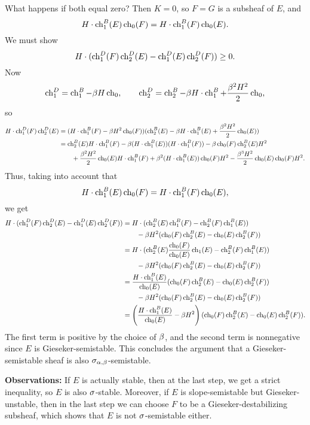 \documentclass[letterpaper,10pt]{article}
\begin{document}
What happens if both equal zero? Then $K = 0$, so $F = G$ is a subsheaf of $E$, and 
\[  H \cdot \ch_1^B(E) \ch_0(F) = H\cdot \ch_1^B(F) \ch_0(E). \]
We must show
\[ H \cdot (\ch_1^D(F) \ch_2^D(E) - \ch_1^D(E) \ch_2^D(F)) \ge 0. \]
Now 
\[ \ch_1^D = \ch_1^B - \be H \ch_0, \qquad \ch_2^D = \ch_2^B - \be H \cdot \ch_1^B + \frac{\be^2 H^2}{2} \ch_0, \]
so
\begin{align*}
    H \cdot \ch_1^D(F) \ch_2^D(E) & = (H\cdot \ch_1^B(F) - \be H^2 \ch_0(F))(\ch_2^B(E) - \be H \cdot \ch_1^B(E) + \frac{\be^2 H^2}{2} \ch_0(E)) \\
    & = \ch_2^B(E) H \cdot \ch_1^B(F) - \be (H \cdot \ch_1^B(E)) (H\cdot\ch_1^B(F)) - \be \ch_0(F) \ch_2^B(E) H^2 \\
    & \qquad + \frac{\be^2 H^2}{2} \ch_0(E) H\cdot \ch_1^B(F) + \be^2 (H\cdot \ch_1^B(E)) \ch_0(F) H^2 - \frac{\be^3 H^2}{2} \ch_0(E) \ch_0(F) H^2.
\end{align*}  
Thus, taking into account that
\[  H \cdot \ch_1^B(E) \ch_0(F) = H\cdot \ch_1^B(F) \ch_0(E), \]
we get
\begin{align*}
    H \cdot (\ch_1^D(F) \ch_2^D(E) - \ch_1^D(E) \ch_2^D(F)) & = H\cdot(\ch_2^B(E) \ch_1^B(F) - \ch_2^B(F) \ch_1^B(E)) \\
    & \qquad - \be H^2 (\ch_0(F) \ch_2^B(E) - \ch_0(E) \ch_2^B(F)) \\
    & = H \cdot (\ch_2^B(E) \frac{\ch_0(F)}{\ch_0(E)} \ch_1(E) - \ch_2^B(F) \ch_1^B(E)) \\
    & \qquad - \be H^2 (\ch_0(F) \ch_2^B(E) - \ch_0(E) \ch_2^B(F)) \\
    & = \frac{H \cdot \ch_1^B(E)}{\ch_0(E)}(\ch_0(F) \ch_2^B(E) - \ch_0(E) \ch_2^B(F)) \\
    & \qquad - \be H^2 (\ch_0(F) \ch_2^B(E) - \ch_0(E) \ch_2^B(F)) \\
    & = \left(\frac{H \cdot \ch_1^B(E)}{\ch_0(E)} - \be H^2\right)(\ch_0(F) \ch_2^B(E) - \ch_0(E) \ch_2^B(F)).
\end{align*}
The first term is positive by the choice of $\be$, and the second term is nonnegative since $E$ is Gieseker-semistable. This concludes the argument that a Gieseker-semistable sheaf is also $\si_{\al,\be}$-semistable.

{\bf Observations:} If $E$ is actually stable, then at the last step, we get a strict inequality, so $E$ is also $\si$-stable. Moreover, if $E$ is slope-semistable but Gieseker-unstable, then in the last step we can choose $F$ to be a Gieseker-destabilizing subsheaf, which shows that $E$ is not $\si$-semistable either.
\end{document}
